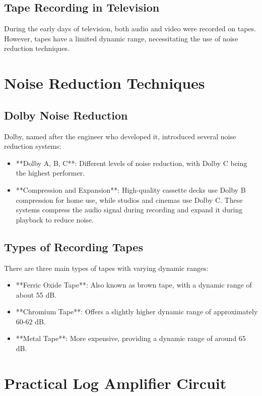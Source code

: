 \subsection{Tape Recording in Television}

During the early days of television, both audio and video were recorded on tapes. However, tapes have a limited dynamic range, necessitating the use of noise reduction techniques.

\section{Noise Reduction Techniques}

\subsection{Dolby Noise Reduction}

Dolby, named after the engineer who developed it, introduced several noise reduction systems:
\begin{itemize}
    \item **Dolby A, B, C**: Different levels of noise reduction, with Dolby C being the highest performer.
    \item **Compression and Expansion**: High-quality cassette decks use Dolby B compression for home use, while studios and cinemas use Dolby C. These systems compress the audio signal during recording and expand it during playback to reduce noise.
\end{itemize}

\subsection{Types of Recording Tapes}

There are three main types of tapes with varying dynamic ranges:
\begin{itemize}
    \item **Ferric Oxide Tape**: Also known as brown tape, with a dynamic range of about 55 dB.
    \item **Chromium Tape**: Offers a slightly higher dynamic range of approximately 60-62 dB.
    \item **Metal Tape**: More expensive, providing a dynamic range of around 65 dB.
\end{itemize}

\section{Practical Log Amplifier Circuit}

